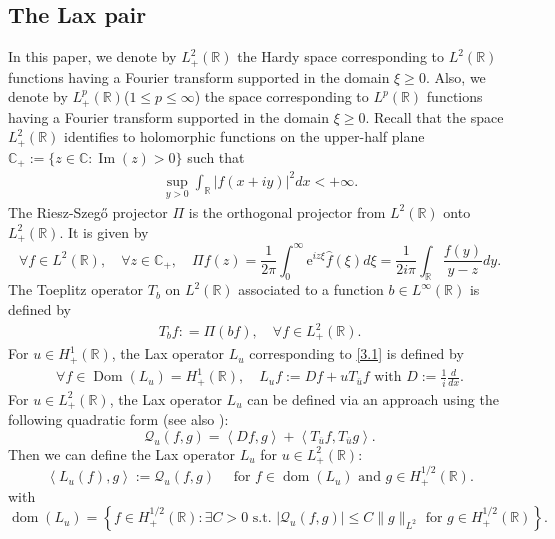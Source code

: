 \documentclass[10pt]{article}
\numberwithin{equation}{section}
\numberwithin{theorem}{section}
\begin{document}
\subsection{The Lax pair}
\label{subsection 2.3}
In this paper, we denote by $L_{+}^{2}(\mathbb{R})$ the Hardy space corresponding to $L^2(\mathbb{R})$ functions having a Fourier transform supported in the domain $\xi \geq 0$. Also, we denote by $L_{+}^{p}(\mathbb{R})$($1\leq p \leq \infty$) the space corresponding to $L^p(\mathbb{R})$ functions having a Fourier transform supported in the domain $\xi \geq 0$. Recall that the space $L_{+}^{2}(\mathbb{R})$ identifies to holomorphic functions on the upper-half plane $\mathbb{C}_{+}:=\{z \in \mathbb{C}: \operatorname{Im}(z)>0\}$ such that
\begin{align*}
\sup _{y>0} \int_{\mathbb{R}}|f(x+i y)|^{2} d x<+\infty.
\end{align*}
The Riesz-Szeg\H{o} projector $\Pi$ is the orthogonal projector from $L^2(\mathbb{R})$ onto $L_{+}^2(\mathbb{R})$. It is given by
\begin{equation}
\label{1.10}
\forall f \in L^2(\mathbb{R}), \quad \forall z \in \mathbb{C}_{+}, \quad \Pi f (z) = \frac{1}{2 \pi} \int_{0}^{\infty} \mathrm{e}^{i z \xi} \widehat{f}(\xi) d \xi=   \frac{1}{2i\pi} \int_{\mathbb{R}} \frac{f(y)}{y-z} dy.
\end{equation}
The Toeplitz operator $T_b$ on $L^{2}(\mathbb{R})$ associated to a function $b \in L^{\infty}(\mathbb{R})$ is defined by
\begin{align*}
T_{b} f : =\Pi(b f), \quad \forall f \in L_{+}^2(\mathbb{R}).
\end{align*}
For $u \in H_{+}^1(\mathbb{R})$, the Lax operator $L_u$ corresponding to \eqref{3.1} is defined by
\begin{align*}
\forall f \in \operatorname{Dom}\left(L_{u}\right)=H_{+}^{1}(\mathbb{R}), \quad  L_{u} f :=D f+uT_{\bar{u}} f \text{ with } D:=\frac{1}{i} \frac{d}{d x}.
\end{align*}
For $u \in L_{+}^2(\mathbb{R})$, the Lax operator $L_u$ can be defined via an approach using the following quadratic form (see also \cite[Appendix A]{5}): 
\[
\mathcal{Q}_u(f,g)=\left\langle Df, g \right\rangle + \left\langle {T_{\overline u}f}, {T_{\overline u}g} \right\rangle.
\]
Then we can define the Lax operator $L_u$ for $u\in L_{+}^2(\mathbb{R})$:
\[
\left\langle L_u(f), g\right\rangle :=\mathcal{Q}_u(f, g) \quad \text { for } f \in \operatorname{dom}\left(L_u\right) \text { and } g \in H_{+}^{1 / 2}(\mathbb{R}) .
\]
with
\[
\operatorname{dom}\left(L_u\right)=\left\{f \in H_{+}^{1 / 2}(\mathbb{R}): \exists C>0 \text { s.t. }\left|\mathcal{Q}_u(f, g)\right| \leq C\|g\|_{L^2} \text { for } g \in H_{+}^{1 / 2}(\mathbb{R})\right\}.
\]
\end{document}
